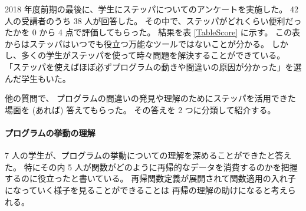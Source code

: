 2018 年度前期の最後に、学生にステッパについてのアンケートを実施した。
42 人の受講者のうち 38 人が回答した。
その中で、ステッパがどれくらい便利だったかを 0 から 4 点で評価してもらった。
結果を表 \ref{TableScore} に示す。
この表からはステッパはいつでも役立つ万能なツールではないことが分かる。
しかし、多くの学生がステッパを使って時々問題を解決することができている。
「ステッパを使えばほぼ必ずプログラムの動きや間違いの原因が分かった」を選んだ学生もいた。

他の質問で、
プログラムの間違いの発見や理解のためにステッパを活用できた場面を (あれば) 答えてもらった。
その答えを 2 つに分類して紹介する。

\paragraph{プログラムの挙動の理解}
7 人の学生が、プログラムの挙動についての理解を深めることができたと答えた。
特にその内 5 人が関数がどのように再帰的なデータを消費するのかを把握するのに役立ったと書いている。
再帰関数定義が展開されて関数適用の入れ子になっていく様子を見ることができることは
再帰の理解の助けになると考えられる。

